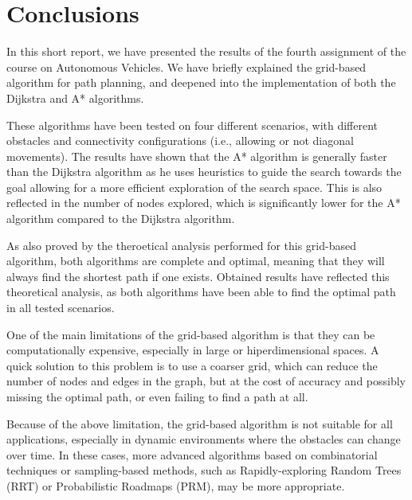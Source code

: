 \section{Conclusions}
\label{sec:conclusions}

In this short report, we have presented the results of the fourth assignment of the course on Autonomous Vehicles.
We have briefly explained the grid-based algorithm for path planning, and deepened into the implementation of both the Dijkstra and A* algorithms.

These algorithms have been tested on four different scenarios, with different obstacles and connectivity configurations (i.e., allowing or not diagonal movements).
The results have shown that the A* algorithm is generally faster than the Dijkstra algorithm as he uses heuristics to guide the search towards the goal allowing for a more efficient exploration of the search space.
This is also reflected in the number of nodes explored, which is significantly lower for the A* algorithm compared to the Dijkstra algorithm.

As also proved by the theroetical analysis performed for this grid-based algorithm, both algorithms are complete and optimal, meaning that they will always find the shortest path if one exists.
Obtained results have reflected this theoretical analysis, as both algorithms have been able to find the optimal path in all tested scenarios.

One of the main limitations of the grid-based algorithm is that they can be computationally expensive, especially in large or hiperdimensional spaces.
A quick solution to this problem is to use a coarser grid, which can reduce the number of nodes and edges in the graph, but at the cost of accuracy and possibly missing the optimal path, or even failing to find a path at all.

Because of the above limitation, the grid-based algorithm is not suitable for all applications, especially in dynamic environments where the obstacles can change over time.
In these cases, more advanced algorithms based on combinatorial techniques or sampling-based methods, such as Rapidly-exploring Random Trees (RRT) or Probabilistic Roadmaps (PRM), may be more appropriate.